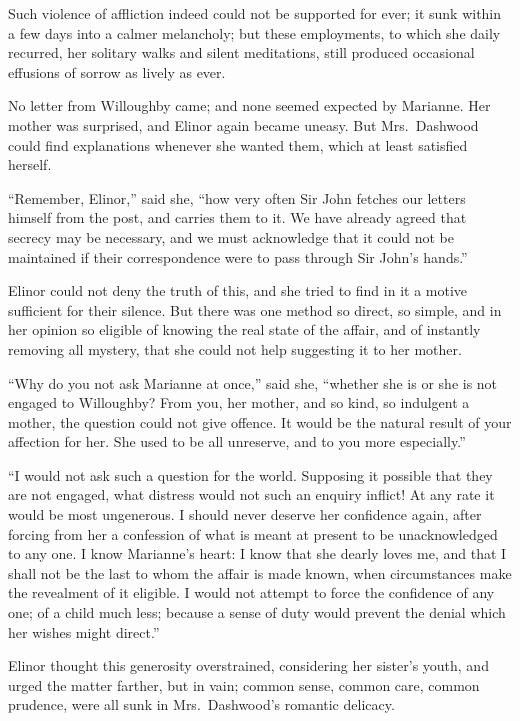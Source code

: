 \documentclass{article}
\begin{document}
Such violence of affliction indeed could not be supported
for ever; it sunk within a few days into a calmer melancholy;
but these employments, to which she daily recurred,
her solitary walks and silent meditations, still produced
occasional effusions of sorrow as lively as ever.

No letter from Willoughby came; and none seemed expected
by Marianne.  Her mother was surprised, and Elinor again
became uneasy.  But Mrs.\ Dashwood could find explanations
whenever she wanted them, which at least satisfied herself.

``Remember, Elinor,'' said she, ``how very often Sir John
fetches our letters himself from the post, and carries them
to it.  We have already agreed that secrecy may be necessary,
and we must acknowledge that it could not be maintained if
their correspondence were to pass through Sir John's hands.''

Elinor could not deny the truth of this, and she tried
to find in it a motive sufficient for their silence.
But there was one method so direct, so simple, and in
her opinion so eligible of knowing the real state
of the affair, and of instantly removing all mystery,
that she could not help suggesting it to her mother.

``Why do you not ask Marianne at once,'' said she,
``whether she is or she is not engaged to Willoughby?  From you,
her mother, and so kind, so indulgent a mother, the question
could not give offence.  It would be the natural result
of your affection for her.  She used to be all unreserve,
and to you more especially.''

``I would not ask such a question for the world.
Supposing it possible that they are not engaged,
what distress would not such an enquiry inflict!  At any
rate it would be most ungenerous.  I should never deserve
her confidence again, after forcing from her a confession
of what is meant at present to be unacknowledged to any one.
I know Marianne's heart: I know that she dearly loves me,
and that I shall not be the last to whom the affair is made
known,
when circumstances make the revealment of it eligible.
I would not attempt to force the confidence of any one;
of a child much less; because a sense of duty would prevent
the denial which her wishes might direct.''

Elinor thought this generosity overstrained,
considering her sister's youth, and urged the matter farther,
but in vain; common sense, common care, common prudence,
were all sunk in Mrs.\ Dashwood's romantic delicacy.
\end{document}
